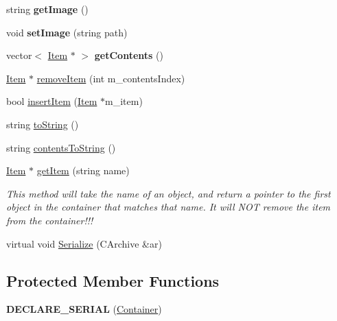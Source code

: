 \begin{DoxyCompactItemize}
string {\bfseries get\+Image} ()
\item 
\hypertarget{class_container_a0ea35092095599c1100d2919b308201f}{}\label{class_container_a0ea35092095599c1100d2919b308201f} 
void {\bfseries set\+Image} (string path)
\item 
\hypertarget{class_container_a2215a87d003e88bab9a86a97a69448ac}{}\label{class_container_a2215a87d003e88bab9a86a97a69448ac} 
vector$<$ \hyperlink{class_item}{Item} $\ast$ $>$ {\bfseries get\+Contents} ()
\item 
\hyperlink{class_item}{Item} $\ast$ \hyperlink{class_container_a8b203900fe9babebd7e744e34321962c}{remove\+Item} (int m\+\_\+contents\+Index)
\item 
bool \hyperlink{class_container_a512e6e65360249dc2fcd1aa5f466a01e}{insert\+Item} (\hyperlink{class_item}{Item} $\ast$m\+\_\+item)
\item 
string \hyperlink{class_container_a2bedbb656854553ca7d22e9212a628fc}{to\+String} ()
\item 
string \hyperlink{class_container_ab00aa23e1f650444e153301a7a247116}{contents\+To\+String} ()
\item 
\hyperlink{class_item}{Item} $\ast$ \hyperlink{class_container_a0a7c5bb0533b6a28ae6b5f0736d75d30}{get\+Item} (string name)
\begin{DoxyCompactList}\small\item\em This method will take the name of an object, and return a pointer to the first object in the container that matches that name. It will N\+OT remove the item from the container!!! \end{DoxyCompactList}\item 
virtual void \hyperlink{class_container_ac274312989a3c896c3d764e2d315dfb7}{Serialize} (C\+Archive \&ar)
\end{DoxyCompactItemize}
\subsection*{Protected Member Functions}
\begin{DoxyCompactItemize}
\item 
\hypertarget{class_container_a7b52c4e148c15a81d2190467a13d3caa}{}\label{class_container_a7b52c4e148c15a81d2190467a13d3caa} 
{\bfseries D\+E\+C\+L\+A\+R\+E\+\_\+\+S\+E\+R\+I\+AL} (\hyperlink{class_container}{Container})
\end{DoxyCompactItemize}
